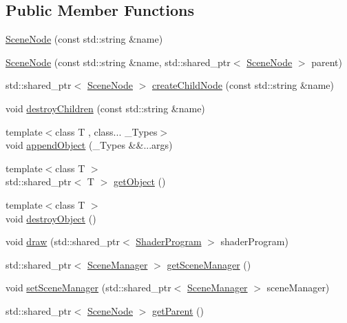 \subsection*{Public Member Functions}
\begin{DoxyCompactItemize}
\item 
\mbox{\hyperlink{classthunder_1_1_scene_node_a78be890be6717725fa46c5cad58e7f44}{Scene\+Node}} (const std\+::string \&name)
\item 
\mbox{\hyperlink{classthunder_1_1_scene_node_ab9beda2e6774d2d209364c891acebc1f}{Scene\+Node}} (const std\+::string \&name, std\+::shared\+\_\+ptr$<$ \mbox{\hyperlink{classthunder_1_1_scene_node}{Scene\+Node}} $>$ parent)
\item 
std\+::shared\+\_\+ptr$<$ \mbox{\hyperlink{classthunder_1_1_scene_node}{Scene\+Node}} $>$ \mbox{\hyperlink{classthunder_1_1_scene_node_abf763f599246d735a8a7f14992366d80}{create\+Child\+Node}} (const std\+::string \&name)
\item 
void \mbox{\hyperlink{classthunder_1_1_scene_node_ae14866fcd4a88c33d8f01f6ada14fdbc}{destroy\+Children}} (const std\+::string \&name)
\item 
{\footnotesize template$<$class T , class... \+\_\+\+Types$>$ }\\void \mbox{\hyperlink{classthunder_1_1_scene_node_a2a45fdece02c7ae3ae62805054f63ae1}{append\+Object}} (\+\_\+\+Types \&\&...args)
\item 
{\footnotesize template$<$class T $>$ }\\std\+::shared\+\_\+ptr$<$ T $>$ \mbox{\hyperlink{classthunder_1_1_scene_node_a2e50c38a3273b593be7ffaee9e057ae0}{get\+Object}} ()
\item 
{\footnotesize template$<$class T $>$ }\\void \mbox{\hyperlink{classthunder_1_1_scene_node_aab9414b8a91d75d10e99337312c8b767}{destroy\+Object}} ()
\item 
void \mbox{\hyperlink{classthunder_1_1_scene_node_a9f3165c5da1789dee03d9a89b7164463}{draw}} (std\+::shared\+\_\+ptr$<$ \mbox{\hyperlink{classthunder_1_1_shader_program}{Shader\+Program}} $>$ shader\+Program)
\item 
std\+::shared\+\_\+ptr$<$ \mbox{\hyperlink{classthunder_1_1_scene_manager}{Scene\+Manager}} $>$ \mbox{\hyperlink{classthunder_1_1_scene_node_aa4da20b8a7369dcb4b2ac262c3701849}{get\+Scene\+Manager}} ()
\item 
void \mbox{\hyperlink{classthunder_1_1_scene_node_a530678fd497174c7409b67d372dd12ed}{set\+Scene\+Manager}} (std\+::shared\+\_\+ptr$<$ \mbox{\hyperlink{classthunder_1_1_scene_manager}{Scene\+Manager}} $>$ scene\+Manager)
\item 
std\+::shared\+\_\+ptr$<$ \mbox{\hyperlink{classthunder_1_1_scene_node}{Scene\+Node}} $>$ \mbox{\hyperlink{classthunder_1_1_scene_node_a40697be350194752846a29c97f1337b7}{get\+Parent}} ()
\end{DoxyCompactItemize}


